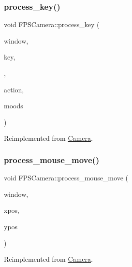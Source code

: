 \subsubsection{\texorpdfstring{process\+\_\+key()}{process\_key()}}
{\footnotesize\ttfamily void F\+P\+S\+Camera\+::process\+\_\+key (\begin{DoxyParamCaption}\item[{G\+L\+F\+Wwindow $\ast$}]{window,  }\item[{int}]{key,  }\item[{int}]{,  }\item[{int}]{action,  }\item[{int}]{moods }\end{DoxyParamCaption})\hspace{0.3cm}{\ttfamily [virtual]}}



Reimplemented from \hyperlink{classCamera_ac7fb896a59f9f456ab2041f9dca9b841}{Camera}.

\mbox{\label{classFPSCamera_a3e776ea7816c76d53a0f688c25c4c338}} 
\subsubsection{\texorpdfstring{process\+\_\+mouse\+\_\+move()}{process\_mouse\_move()}}
{\footnotesize\ttfamily void F\+P\+S\+Camera\+::process\+\_\+mouse\+\_\+move (\begin{DoxyParamCaption}\item[{G\+L\+F\+Wwindow $\ast$}]{window,  }\item[{double}]{xpos,  }\item[{double}]{ypos }\end{DoxyParamCaption})\hspace{0.3cm}{\ttfamily [virtual]}}



Reimplemented from \hyperlink{classCamera_abb67395d3094b766d86ad17cedc054c3}{Camera}.

\mbox{\label{classFPSCamera_a45640c2e2234cdae4e12bded299e19e8}} 
